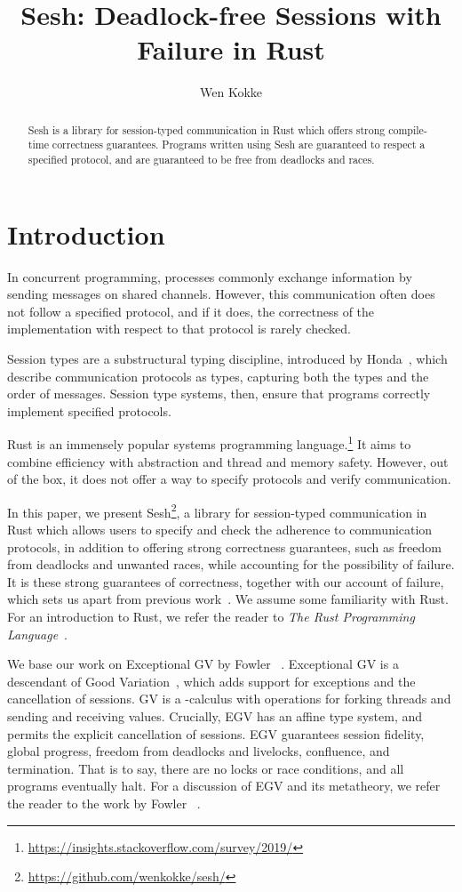 \documentclass[copyright,creativecommons]{eptcs}
\title{Sesh: Deadlock-free Sessions with Failure in Rust}
\author{Wen Kokke
  \institute{LFCS, University of Edinburgh, 10 Crichton St, EH8 9AB, Edinburgh, United Kingdom}
  \email{wen.kokke@ed.ac.uk}
}
\begin{document}
\maketitle

\begin{abstract}
  Sesh is a library for session-typed communication in Rust which offers strong compile-time correctness guarantees. Programs written using Sesh are guaranteed to respect a specified protocol, and are guaranteed to be free from deadlocks and races.
\end{abstract}

\section{Introduction}\label{sec:introduction}
In concurrent programming, processes commonly exchange information by sending messages on shared channels. However, this communication often does not follow a specified protocol, and if it does, the correctness of the implementation with respect to that protocol is rarely checked.

Session types are a substructural typing discipline, introduced by Honda~\cite{honda1993}, which describe communication protocols as types, capturing both the types and the order of messages. Session type systems, then, ensure that programs correctly implement specified protocols.

Rust is an immensely popular systems programming language.\footnote{\url{https://insights.stackoverflow.com/survey/2019/}} It aims to combine efficiency with abstraction and thread and memory safety. However, out of the box, it does not offer a way to specify protocols and verify communication.

In this paper, we present Sesh\footnote{\url{https://github.com/wenkokke/sesh/}}, a library for session-typed communication in Rust which allows users to specify and check the adherence to communication protocols, in addition to offering strong correctness guarantees, such as freedom from deadlocks and unwanted races, while accounting for the possibility of failure. It is these strong guarantees of correctness, together with our account of failure, which sets us apart from previous work~\cite{jespersen2015}. We assume some familiarity with Rust. For an introduction to Rust, we refer the reader to \textit{The Rust Programming Language}~\cite{rust2019}.

We base our work on Exceptional GV by Fowler \etal~\cite[EGV]{fowler2019}. Exceptional GV is a descendant of Good Variation~\cite[GV]{wadler2012}, which adds support for exceptions and the cancellation of sessions. GV is a \textlambda-calculus with operations for forking threads and sending and receiving values. Crucially, EGV has an affine type system, and permits the explicit cancellation of sessions. EGV guarantees session fidelity, global progress, freedom from deadlocks and livelocks, confluence, and termination. That is to say, there are no locks or race conditions, and all programs eventually halt. For a discussion of EGV and its metatheory, we refer the reader to the work by Fowler \etal~\cite{fowler2019}.
\end{document}
